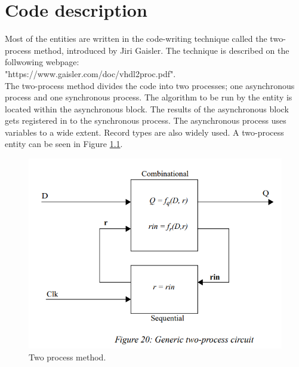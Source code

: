 \newpage
\chapter{Code description}
Most of the entities are written in the code-writing technique called the two-process method, introduced by Jiri Gaisler.
The technique is described on the follwowing webpage:\\ "https://www.gaisler.com/doc/vhdl2proc.pdf".\\


The two-process method divides the code into two processes; one asynchronous process and one synchronous process. The algorithm to be run by the entity is located within the asynchronous block. The results of the asynchronous block gets registered in to the synchronous process. The asynchronous process uses variables to a wide extent. Record types are also widely used. A two-process entity can be seen in Figure \ref{fig:two_process}.



\begin{figure}                                                         \centering
   \includegraphics[scale=0.45]{images/two_process_method}
  \caption{ Two process method.} 
  \label{fig:two_process}
\end{figure}
 